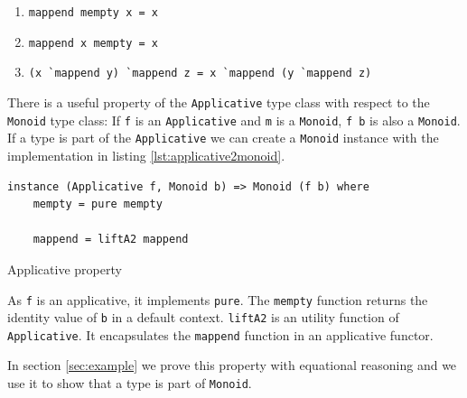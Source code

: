 \begin{enumerate}
\item \verb|mappend mempty x = x|
\item \verb|mappend x mempty = x|
\item \verb|(x `mappend y) `mappend z = x `mappend (y `mappend z)|
\end{enumerate}

There is a useful property of the \verb|Applicative| type class with respect to the \verb|Monoid| type class: If \verb|f| is an \verb|Applicative| and \verb|m| is a \verb|Monoid|, \verb|f b| is also a \verb|Monoid|. If a type is part of the \verb|Applicative| we can create a \verb|Monoid| instance with the implementation in listing \ref{lst:applicative2monoid}.

\begin{program}
\begin{verbatim}
instance (Applicative f, Monoid b) => Monoid (f b) where
    mempty = pure mempty

    mappend = liftA2 mappend
\end{verbatim}
\label{lst:applicative2monoid}
\caption{Applicative property}
\end{program}

As \verb|f| is an applicative, it implements \verb|pure|. The \verb|mempty| function returns the identity value of \verb|b| in a default context. \verb|liftA2| is an utility function of \verb|Applicative|. It encapsulates the \verb|mappend| function in an applicative functor. 

In section \ref{sec:example} we prove this property with equational reasoning and we use it to show that a type is part of \verb|Monoid|.
